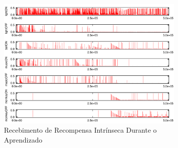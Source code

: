 \documentclass[kdmile,a4paper]{kdmile} %
\begin{document}
\begin{figure}
  \begin{subfigure}[t]{\textwidth}
    \includegraphics[width=\textwidth]{r_i-2014-07-12_07-15-03-Teri}
    \caption{Recebimento de Recompensa Intrínseca Durante o Aprendizado}
    \label{fig:ri}
  \end{subfigure}
  \caption{}\label{fig:res}
\end{figure}





\end{document}
